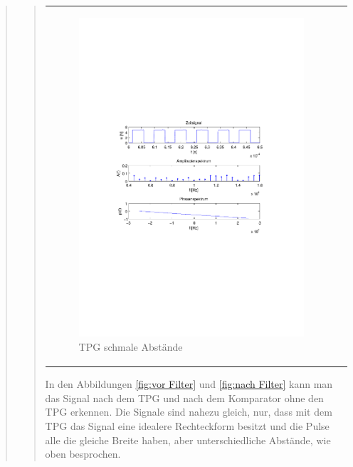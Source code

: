 \begin{quote}
\begin{quote}
\begin{center}
\begin{tabular}{ll}
                \begin{minipage}{0.67\textwidth}
                    \begin{figure}[H]
                        \label{fig:TPGschmal}
                        \includegraphics[scale=0.7, trim = 35mm 100mm 35mm 95mm, clip]{Bilder/f1TwPu_schmal}
                        \caption{TPG schmale Abstände}
                    \end{figure}
                \end{minipage}
            
            \end{tabular}
            \end{center}
          
          In den Abbildungen \ref{fig:vor Filter} und \ref{fig:nach Filter} kann
          man das Signal nach dem TPG und nach dem Komparator ohne den TPG
          erkennen. Die Signale sind nahezu gleich, nur, dass mit dem TPG das
          Signal eine idealere Rechteckform besitzt und die Pulse alle die
          gleiche Breite haben, aber unterschiedliche Abstände, wie oben
          besprochen.
            

\end{quote}
\end{quote}
